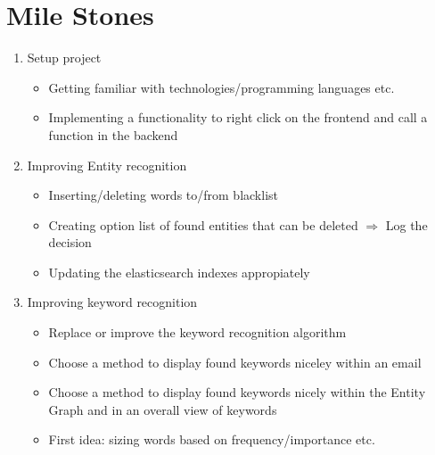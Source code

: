 \documentclass[a4paper]{article}
\begin{document}
\clearpage

\section{Mile Stones}
\begin{enumerate}
	\item Setup project
	\begin{itemize}
		\item Getting familiar with technologies/programming languages etc.
		\item Implementing a functionality to right click on the frontend and call a function in the backend
	\end{itemize}
	\item Improving Entity recognition
	\begin{itemize}
		\item Inserting/deleting words to/from blacklist
		\item Creating option list of found entities that can be deleted $\Rightarrow$ Log the decision
		\item Updating the elasticsearch indexes appropiately
	\end{itemize}
	\item Improving keyword recognition
	\begin{itemize}
		\item Replace or improve the keyword recognition algorithm
		\item Choose a method to display found keywords niceley within an email
		\item Choose a method to display found keywords nicely within the Entity Graph and in an overall view of keywords
		\item First idea: sizing words based on frequency/importance etc.
	\end{itemize}
\end{enumerate}
\end{document}
